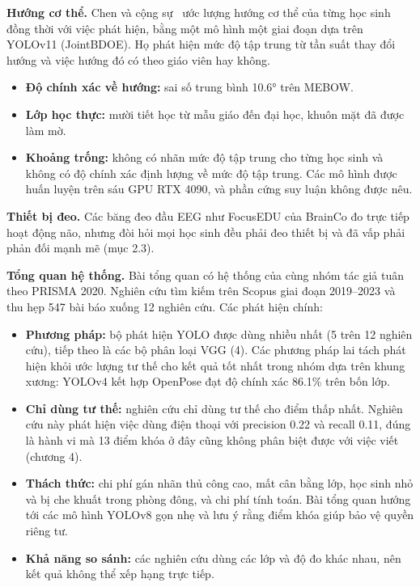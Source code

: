 \textbf{Hướng cơ thể.} Chen và cộng sự~\cite{b1} ước lượng hướng cơ thể của từng học sinh đồng thời với việc phát hiện, bằng một mô hình một giai đoạn dựa trên YOLOv11 (JointBDOE). Họ phát hiện mức độ tập trung từ tần suất thay đổi hướng và việc hướng đó có theo giáo viên hay không.

\begin{itemize}
\tightlist
\item
  \textbf{Độ chính xác về hướng:} sai số trung bình 10.6° trên MEBOW.
\item
  \textbf{Lớp học thực:} mười tiết học từ mẫu giáo đến đại học, khuôn mặt đã được làm mờ.
\item
  \textbf{Khoảng trống:} không có nhãn mức độ tập trung cho từng học sinh và không có độ chính xác định lượng về mức độ tập trung. Các mô hình được huấn luyện trên sáu GPU RTX 4090, và phần cứng suy luận không được nêu.
\end{itemize}

\textbf{Thiết bị đeo.} Các băng đeo đầu EEG như FocusEDU của BrainCo đo trực tiếp hoạt động não, nhưng đòi hỏi mọi học sinh đều phải đeo thiết bị và đã vấp phải phản đối mạnh mẽ (mục 2.3).

\textbf{Tổng quan hệ thống.} Bài tổng quan có hệ thống của cùng nhóm tác giả \cite{b4} tuân theo PRISMA 2020. Nghiên cứu tìm kiếm trên Scopus giai đoạn 2019--2023 và thu hẹp 547 bài báo xuống 12 nghiên cứu. Các phát hiện chính:

\begin{itemize}
\tightlist
\item
  \textbf{Phương pháp:} bộ phát hiện YOLO được dùng nhiều nhất (5 trên 12 nghiên cứu), tiếp theo là các bộ phân loại VGG (4). Các phương pháp lai tách phát hiện khỏi ước lượng tư thế cho kết quả tốt nhất trong nhóm dựa trên khung xương: YOLOv4 kết hợp OpenPose đạt độ chính xác 86.1\% trên bốn lớp.
\item
  \textbf{Chỉ dùng tư thế:} nghiên cứu chỉ dùng tư thế cho điểm thấp nhất. Nghiên cứu này phát hiện việc dùng điện thoại với precision 0.22 và recall 0.11, đúng là hành vi mà 13 điểm khóa ở đây cũng không phân biệt được với việc viết (chương 4).
\item
  \textbf{Thách thức:} chi phí gán nhãn thủ công cao, mất cân bằng lớp, học sinh nhỏ và bị che khuất trong phòng đông, và chi phí tính toán. Bài tổng quan hướng tới các mô hình YOLOv8 gọn nhẹ và lưu ý rằng điểm khóa giúp bảo vệ quyền riêng tư.
\item
  \textbf{Khả năng so sánh:} các nghiên cứu dùng các lớp và độ đo khác nhau, nên kết quả không thể xếp hạng trực tiếp.
\end{itemize}

